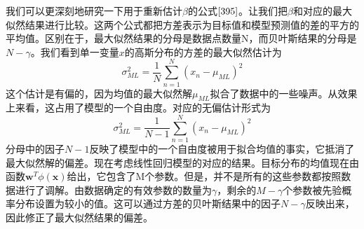 我们可以更深刻地研究一下用于重新估计$\beta$的公式$\ref{395}$。让我们把$\beta$和对应的最大似然结果进行比较。这两个公式都把方差表示为目标值和模型预测值的差的平方的平均值。区别在于，最大似然结果的分母是数据点数量N，而贝叶斯结果的分母是$N-\gamma$。我们看到单一变量$x$的高斯分布的方差的最大似然估计为
\begin{equation}
	\sigma_{ML}^2=\frac{1}{N}\sum_{n=1}^{N}(x_n-\mu_{ML})^2
\end{equation}
这个估计是有偏的，因为均值的最大似然解$\mu_{ML}$拟合了数据中的一些噪声。从效果上来看，这占用了模型的一个自由度。对应的无偏估计形式为
\begin{equation}
\sigma_{ML}^2=\frac{1}{N-1}\sum_{n=1}^{N}(x_n-\mu_{ML})^2
\end{equation}
分母中的因子$N-1$反映了模型中的一个自由度被用于拟合均值的事实，它抵消了最大似然解的偏差。现在考虑线性回归模型的对应的结果。目标分布的均值现在由函数$\boldsymbol{w}^T\phi(\boldsymbol{x})$给出，它包含了M个参数。但是，并不是所有的这些参数都按照数据进行了调解。由数据确定的有效参数的数量为$\gamma$，剩余的$M-\gamma$个参数被先验概率分布设置为较小的值。这可以通过方差的贝叶斯结果中的因子$N-\gamma$反映出来，因此修正了最大似然结果的偏差。